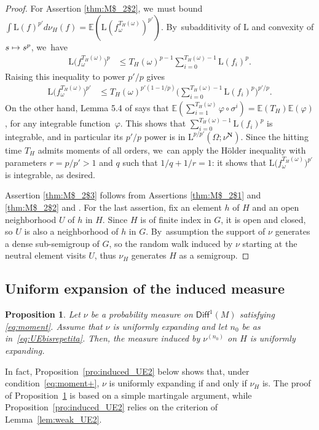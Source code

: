 \documentclass[11pt]{article}
\newcommand{\Subsection}{\subsection}
\newcommand\mto{\mathchoice{\longmapsto}{\mapsto}{\mapsto}{\mapsto}}
\newcommand{\blrpar}[1]{\bigl(#1\bigr)}
\newcommand{\bblrpar}[1]{\biggl(#1\biggr)}
\newcommand{\ee}{\mathbb{E}}
\def\N{\mathbf{N}}
\newcommand\Diff{{\mathsf{Diff}}}
\theoremstyle{plain}
\newtheorem{pro}[thm]{Proposition}
\theoremstyle{definition}
\numberwithin{equation}{section}
\begin{document}
\begin{proof}
For Assertion \eqref{thm:M$_2$2}, we~must bound
$\int \mathrm L(f)^{p'} d\nu_H(f)= \ee ( \mathrm L(f_\omega^{T_H(\omega)})^{p'} )$. By~subadditivity of $\mathrm L$ and convexity of $s\mto s^{p}$, we~have
\begin{align*} \label{eq:int_T}
\mathrm L\blrpar{f_\omega^{T_H(\omega)}}^{p}
& \leq T_H(\omega)^{p-1} \sum_{i=0}^{T_H(\omega)-1} {\mathrm L(f_i)}^{p}.
\end{align*}
Raising this inequality to power $p'/p$ gives
\begin{align*}
\mathrm L\blrpar{f_\omega^{T_H(\omega)}}^{p'} & \leq T_H(\omega)^{p'(1-1/p)}
\bblrpar{\sum_{i=0}^{T_H(\omega)-1} {\mathrm L(f_i)}^{p}}^{p'/p}.
\end{align*}
On the other hand, Lemma 5.4 of \cite{benoist-quint_book} says that $\ee(\sum_{i=1}^{T_H(\omega)}\varphi \circ\sigma^i ) = \ee(T_H)\ee(\varphi)$, for any integrable function~$\varphi$. This shows that $\sum_{i=0}^{T_H(\omega)-1} {\mathrm L(f_i)}^{p}$ is integrable, and in particular its $p'/p$ power
is in $\mathrm L^{p/p'}(\Omega; \nu^\N)$. Since the hitting time $T_H$ admits moments of all orders, we~can apply the Hölder
inequality with parameters $r=p/p'>1$ and $q$ such that $1/q+1/r=1$: it shows that $\mathrm L\blrpar{f_\omega^{T_H(\omega)}}^{p'} $ is integrable, as desired.

Assertion \eqref{thm:M$_2$3} follows from Assertions \eqref{thm:M$_2$1} and \eqref{thm:M$_2$2} and \cite[Cor.\,5.6]{benoist-quint_book}.
For the last assertion, fix an element $h$ of $H$ and an open neighborhood $U$ of $h$ in $H$.
Since $H$ is of finite index in $G$, it is open and closed, so $U$ is also a neighborhood of $h$ in $G$. By~assumption the support of $\nu$ generates a dense sub-semigroup of
$G$, so the random walk induced by $\nu$ starting at the neutral element visits $U$,
thus $\nu_H$ generates $H$ as a semigroup. \end{proof}

\Subsection{Uniform expansion of the induced measure}

\begin{pro}\label{pro:induced_UE}
Let $\nu$ be a probability measure on $\Diff^1(M)$ satisfying \eqref{eq:moment}. Assume that $\nu$ is uniformly expanding and
let $n_0$ be as in~\eqref{eq:UEbisrepetita}. Then, the measure induced by
$\nu^{(n_0)}$ on $H$ is uniformly expanding.
\end{pro}

In fact,
Proposition~\ref{pro:induced_UE2} below shows that, under condition~\eqref{eq:moment+}, $\nu$ is uniformly expanding if
and only if $\nu_H$ is. The proof of Proposition~\ref{pro:induced_UE} is based on a simple martingale argument, while
Proposition~\ref{pro:induced_UE2} relies on the criterion of Lemma~\ref{lem:weak_UE2}.
\end{document}

